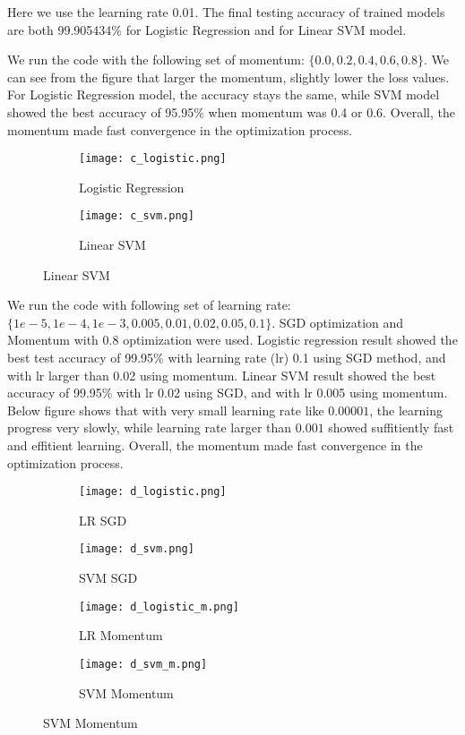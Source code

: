 \documentclass[10pt]{article}
\newcommand{\0}{{\mathbf{0}}}
\newcommand{\1}{{\mathbf{1}}}
\newcommand{\pr}[1]{\noindent{\bf #1.}}
\begin{document}
\pr{(b)} Here we use the learning rate 0.01. The final testing accuracy of trained models are both 99.905434\% for Logistic Regression and for Linear SVM model. 

\pr{(c)} We run the code with the following set of momentum: $\{0.0, 0.2, 0.4, 0.6, 0.8 \}$. We can see from the figure that larger the momentum, slightly lower the loss values. For Logistic Regression model, the accuracy stays the same, while SVM model showed the best accuracy of 95.95\% when momentum was 0.4 or 0.6. Overall, the momentum made fast convergence in the optimization process.

\begin{figure}[ht]
     \centering
     \begin{subfigure}[b]{0.45\textwidth}
         \centering
         \texttt{[image: c\_logistic.png]}
         \caption{Logistic Regression}
     \end{subfigure}
     \hfill
     \begin{subfigure}[b]{0.45\textwidth}
         \centering
         \texttt{[image: c\_svm.png]}
         \caption{Linear SVM}
     \end{subfigure}
\end{figure}

\pr{(d)} We run the code with following set of learning rate: $\{1e-5, 1e-4, 1e-3, 0.005, 0.01, 0.02, 0.05, 0.1 \}$. SGD optimization and Momentum with $0.8$ optimization were used. Logistic regression result showed the best test accuracy of 99.95\% with learning rate (lr) 0.1 using SGD method, and with lr larger than 0.02 using momentum. Linear SVM result showed the best accuracy of 99.95\% with lr 0.02 using SGD, and with lr 0.005 using momentum. Below figure shows that with very small learning rate like $0.00001$, the learning progress very slowly, while learning rate larger than $0.001$ showed suffitiently fast and effitient learning. Overall, the momentum made fast convergence in the optimization process.

\begin{figure}[ht]
     \centering
     \begin{subfigure}[b]{0.24\textwidth}
         \centering
         \texttt{[image: d\_logistic.png]}
         \caption{LR SGD}
     \end{subfigure}
     \hfill
     \begin{subfigure}[b]{0.24\textwidth}
         \centering
         \texttt{[image: d\_svm.png]}
         \caption{SVM SGD}
     \end{subfigure}
     \begin{subfigure}[b]{0.24\textwidth}
         \centering
         \texttt{[image: d\_logistic\_m.png]}
         \caption{LR Momentum}
     \end{subfigure}
     \hfill
     \begin{subfigure}[b]{0.24\textwidth}
         \centering
         \texttt{[image: d\_svm\_m.png]}
         \caption{SVM Momentum}
     \end{subfigure}
\end{figure}
\end{document}
